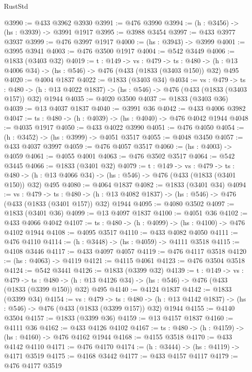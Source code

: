 \begin{lexlean}{RustStd}
\begin{coremodule}
@3990 := @433 @3962 @3930
@3991 := @476 @3990
@3994 := (h : @3456) -> (hs : @3939) -> @3991 @1917
@3995 := @3988 @3454
@3997 := @433 @3977 @3937
@3999 := @476 @3997 @1917
@4000 := (hs : @3943) -> @3999
@4001 := @3995 @3941
@4003 := @476 @3500 @1917
@4004 := @542 @3449
@4006 := @1833 (@3403 @32)
@4019 := {t : @149} ->
  {vs : @479} ->
  {ts : @480} -> (h : @13 @4006 @34) -> (hs : @546) -> @476 (@433 (@1833 (@3403 @150)) @32) @495
@4020 := @4004 @1837
@4022 := @1833 (@3403 @34)
@4034 := {vs : @479} ->
  {ts : @480} -> (h : @13 @4022 @1837) -> (hs : @546) -> @476 (@433 (@1833 (@3403 @157)) @32) @1944
@4035 := @4020 @3500
@4037 := @1833 (@3403 @36)
@4039 := @13 @4037 @1837
@4040 := @3991 @36
@4042 := @433 @4006 @3982
@4047 := {ts : @480} -> (h : @4039) -> (hs : @4040) -> @476 @4042 @1944
@4048 := @4035 @1917
@4050 := @433 @4022 @3990
@4051 := @476 @4050
@4054 := (h : @3452) -> (hs : @3999) -> @4051 @3517
@4055 := @4048 @3450
@4057 := @433 @4037 @3997
@4059 := @476 @4057 @3517
@4060 := (hs : @4003) -> @4059
@4061 := @4055 @4001
@4063 := @476 @3502 @3517
@4064 := @542 @3445
@4066 := @1833 (@3401 @32)
@4079 := {t : @149} ->
  {vs : @479} ->
  {ts : @480} -> (h : @13 @4066 @34) -> (hs : @546) -> @476 (@433 (@1833 (@3401 @150)) @32) @495
@4080 := @4064 @1837
@4082 := @1833 (@3401 @34)
@4094 := {vs : @479} ->
  {ts : @480} -> (h : @13 @4082 @1837) -> (hs : @546) -> @476 (@433 (@1833 (@3401 @157)) @32) @1944
@4095 := @4080 @3502
@4097 := @1833 (@3401 @36)
@4099 := @13 @4097 @1837
@4100 := @4051 @36
@4102 := @433 @4066 @4042
@4107 := {ts : @480} -> (h : @4099) -> (hs : @4100) -> @476 @4102 @1944
@4108 := @4095 @3517
@4110 := @433 @4082 @4050
@4111 := @476 @4110
@4114 := (h : @3448) -> (hs : @4059) -> @4111 @3518
@4115 := @4108 @3446
@4117 := @433 @4097 @4057
@4119 := @476 @4117 @3518
@4120 := (hs : @4063) -> @4119
@4121 := @4115 @4061
@4123 := @476 @3504 @3518
@4124 := @542 @3441
@4126 := @1833 (@3399 @32)
@4139 := {t : @149} ->
  {vs : @479} ->
  {ts : @480} -> (h : @13 @4126 @34) -> (hs : @546) -> @476 (@433 (@1833 (@3399 @150)) @32) @495
@4140 := @4124 @1837
@4142 := @1833 (@3399 @34)
@4154 := {vs : @479} ->
  {ts : @480} -> (h : @13 @4142 @1837) -> (hs : @546) -> @476 (@433 (@1833 (@3399 @157)) @32) @1944
@4155 := @4140 @3504
@4157 := @1833 (@3399 @36)
@4159 := @13 @4157 @1837
@4160 := @4111 @36
@4162 := @433 @4126 @4102
@4167 := {ts : @480} -> (h : @4159) -> (hs : @4160) -> @476 @4162 @1944
@4168 := @4155 @3518
@4170 := @433 @4142 @4110
@4171 := @476 @4170
@4174 := (h : @3444) -> (hs : @4119) -> @4171 @3519
@4175 := @4168 @3442
@4177 := @433 @4157 @4117
@4179 := @476 @4177 @3519

\end{coremodule}
\end{lexlean}
